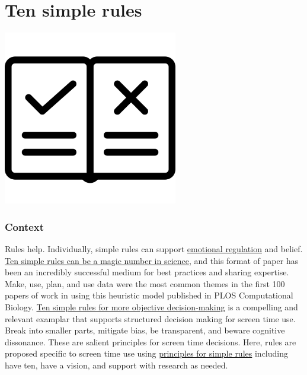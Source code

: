 \documentclass[
]{book}
\begin{document}
\hypertarget{rules}{%
\chapter{Ten simple rules}\label{rules}}

\includegraphics[width=3in,height=\textheight]{./rules.png}

\hypertarget{context-1}{%
\subsection*{Context}\label{context-1}}

Rules help. Individually, simple rules can support \href{https://psycnet.apa.org/doiLanding?doi=10.1037\%2Fcap0000142}{emotional regulation} and belief. \href{https://journals.plos.org/ploscompbiol/article?id=10.1371/journal.pcbi.1006670}{Ten simple rules can be a magic number in science}, and this format of paper has been an incredibly successful medium for best practices and sharing expertise. Make, use, plan, and use data were the most common themes in the first 100 papers of work in using this heuristic model published in PLOS Computational Biology. \href{https://journals.plos.org/ploscompbiol/article?id=10.1371/journal.pcbi.1007706}{Ten simple rules for more objective decision-making} is a compelling and relevant examplar that supports structured decision making for screen time use. Break into smaller parts, mitigate bias, be transparent, and beware cognitive dissonance. These are salient principles for screen time decisions. Here, rules are proposed specific to screen time use using \href{https://journals.plos.org/ploscompbiol/article?id=10.1371/journal.pcbi.1003858}{principles for simple rules} including have ten, have a vision, and support with research as needed.
\end{document}

